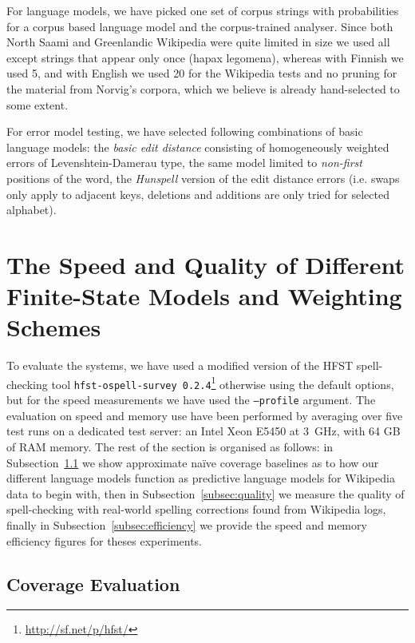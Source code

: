 \documentclass[a4paper,12pt]{article}
\begin{document}
For language models, we have picked one set of corpus strings with
probabilities for a corpus based language model and the corpus-trained
analyser. Since both North Saami and Greenlandic Wikipedia were quite limited in
size we used all except strings that appear only once (hapax legomena), whereas
with Finnish we used 5, and with English we used 20 for the Wikipedia
tests and no pruning for the material from Norvig's corpora, which we believe
is already hand-selected to some extent.

For error model testing, we have selected following combinations of basic
language models: the \emph{basic edit distance} consisting of homogeneously
weighted errors of Levenshtein-Damerau type, the same model limited to
\emph{non-first} positions of the word, the \emph{Hunspell} version of the edit
distance errors (i.e. swaps only apply to adjacent keys, deletions and
additions are only tried for selected alphabet).


\section{The Speed and Quality of Different Finite-State Models and Weighting
Schemes}
\label{sec:evaluation}

To evaluate the systems, we have used a modified version of the HFST
spell-checking tool \texttt{hfst-ospell-survey
0.2.4}\footnote{\url{http://sf.net/p/hfst/}} otherwise using the default
options, but for the speed measurements we have used the \texttt{--profile}
argument.  The evaluation on speed and memory use have been performed by
averaging over five test runs on a dedicated test server: an Intel
Xeon E5450 at 3~GHz, with 64 GB of RAM memory. The rest of the section is
organised as follows: in Subsection~\ref{subsec:coverage} we show approximate
naïve coverage baselines as to how our different language models function
as predictive language models for Wikipedia data to begin with, then
in Subsection~\ref{subsec:quality} we measure the quality of spell-checking
with real-world spelling corrections found from Wikipedia logs, finally in
Subsection~\ref{subsec:efficiency} we provide the speed and memory
efficiency figures for theses experiments.

\subsection{Coverage Evaluation}
\label{subsec:coverage}
\end{document}
